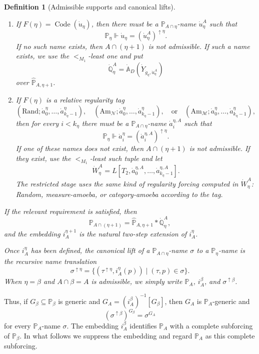 \documentclass[a4paper,11pt]{article}
\newtheorem{definition}[theorem]{Definition}
\begin{document}
\begin{definition}[Admissible supports and canonical lifts]
\begin{enumerate}
   \item If \(F(\eta)=\operatorname{Code}(\dot u_\eta)\), then there must be a
   \(\mathbb P_{A\cap\eta}\)-name \(\dot u^A_\eta\) such that
   \[
      \mathbb P_\eta\Vdash
      \dot u_\eta=(\dot u^A_\eta)^{\uparrow\eta}.
   \]
   If no such name exists, then \(A\cap(\eta+1)\) is not admissible.  If such a
   name exists, we use the \(<_{M_1}\)-least one and put
   \[
      \dot{\mathbb Q}^A_\eta
      =\dot{\mathbb A}_D(\dot Y_{\dot g_\eta,\dot u^A_\eta})
   \]
   over \(\widehat{\mathbb P}_{A,\eta+1}\).

   \item If \(F(\eta)\) is a relative regularity tag
   \[
      (\mathrm{Rand};\dot a^\eta_0,\ldots,\dot a^\eta_{k_\eta-1}),
      \quad
      (\mathrm{Am}_{\mathcal N};\dot a^\eta_0,\ldots,
         \dot a^\eta_{k_\eta-1}),
      \quad\text{or}\quad
      (\mathrm{Am}_{\mathcal M};\dot a^\eta_0,\ldots,
         \dot a^\eta_{k_\eta-1}),
   \]
   then for every \(i<k_\eta\) there must be a
   \(\mathbb P_{A\cap\eta}\)-name \(\dot a^{\eta,A}_i\) such that
   \[
      \mathbb P_\eta\Vdash
      \dot a^\eta_i=(\dot a^{\eta,A}_i)^{\uparrow\eta}.
   \]
   If one of these names does not exist, then \(A\cap(\eta+1)\) is not
   admissible.  If they exist, use the \(<_{M_1}\)-least such tuple and let
   \[
      \dot W^A_\eta
      =L[T_2,
         \dot a^{\eta,A}_0,\ldots,
         \dot a^{\eta,A}_{k_\eta-1}].
   \]
   The restricted stage uses the same kind of regularity forcing computed in
   \(\dot W^A_\eta\): Random, measure-amoeba, or category-amoeba according to
   the tag.
\end{enumerate}
If the relevant requirement is satisfied, then
\[
   \mathbb P_{A\cap(\eta+1)}
   =\widehat{\mathbb P}_{A,\eta+1}*\dot{\mathbb Q}^A_\eta,
\]
and the embedding \(i_A^{\eta+1}\) is the natural two-step extension of
\(i_A^\eta\).

Once \(i_A^\eta\) has been defined, the canonical lift of a
\(\mathbb P_{A\cap\eta}\)-name \(\sigma\) to a \(\mathbb P_\eta\)-name is the
recursive name translation
\[
   \sigma^{\uparrow\eta}
   =
   \{(\tau^{\uparrow\eta},i_A^\eta(p))\mid (\tau,p)\in\sigma\}.
\]
When \(\eta=\beta\) and \(A\cap\beta=A\) is admissible, we simply write
\(\mathbb P_A\), \(i_A^\beta\), and \(\sigma^{\uparrow\beta}\).
\end{definition}

Thus, if \(G_\beta\subseteq\mathbb P_\beta\) is generic and
\(G_A=(i_A^\beta)^{-1}[G_\beta]\), then \(G_A\) is
\(\mathbb P_A\)-generic and
\[
   (\sigma^{\uparrow\beta})^{G_\beta}=\sigma^{G_A}
\]
for every \(\mathbb P_A\)-name \(\sigma\).  The embedding
\(i_A^\beta\) identifies \(\mathbb P_A\) with a complete subforcing of
\(\mathbb P_\beta\).  In what follows we suppress the embedding and regard
\(\mathbb P_A\) as this complete subforcing.
\end{document}
